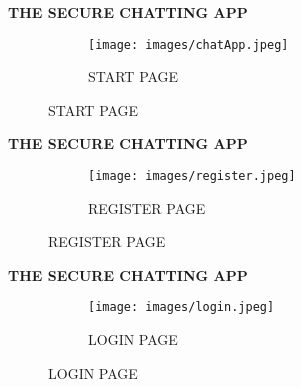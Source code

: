 \documentclass{beamer}
\begin{document}
\begin{frame}
\begin{tcolorbox}
\begin{center}
\textsc{\textbf{\textcolor{byzantium}{THE SECURE CHATTING APP}}}
\end{center}
\end{tcolorbox}
\begin{figure}
\centering
\begin{subfigure}{\textwidth}
  \centering
  \texttt{[image: images/chatApp.jpeg]}
  \caption{START PAGE }
  \label{fig:sub1}
\end{subfigure}
\end{figure}
\end{frame}

\begin{frame}
\begin{tcolorbox}
\begin{center}
\textsc{\textbf{\textcolor{byzantium}{THE SECURE CHATTING APP}}}
\end{center}
\end{tcolorbox}
\begin{figure}
\centering
\begin{subfigure}{\textwidth}
  \centering
  \texttt{[image: images/register.jpeg]}
  \caption{REGISTER PAGE }
  \label{fig:sub1}
\end{subfigure}
\end{figure}
\end{frame}

\begin{frame}
\begin{tcolorbox}
\begin{center}
\textsc{\textbf{\textcolor{byzantium}{THE SECURE CHATTING APP}}}
\end{center}
\end{tcolorbox}
\begin{figure}
\centering
\begin{subfigure}{\textwidth}
  \centering
  \texttt{[image: images/login.jpeg]}
  \caption{LOGIN PAGE }
  \label{fig:sub1}
\end{subfigure}
\end{figure}
\end{frame}
\end{document}
